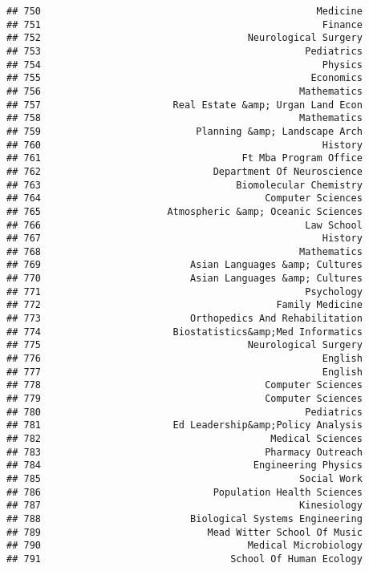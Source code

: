 \documentclass[
]{article}
\begin{document}
\begin{verbatim}
## 750                                                Medicine
## 751                                                 Finance
## 752                                    Neurological Surgery
## 753                                              Pediatrics
## 754                                                 Physics
## 755                                               Economics
## 756                                             Mathematics
## 757                       Real Estate &amp; Urgan Land Econ
## 758                                             Mathematics
## 759                           Planning &amp; Landscape Arch
## 760                                                 History
## 761                                   Ft Mba Program Office
## 762                              Department Of Neuroscience
## 763                                  Biomolecular Chemistry
## 764                                       Computer Sciences
## 765                      Atmospheric &amp; Oceanic Sciences
## 766                                              Law School
## 767                                                 History
## 768                                             Mathematics
## 769                          Asian Languages &amp; Cultures
## 770                          Asian Languages &amp; Cultures
## 771                                              Psychology
## 772                                         Family Medicine
## 773                          Orthopedics And Rehabilitation
## 774                       Biostatistics&amp;Med Informatics
## 775                                    Neurological Surgery
## 776                                                 English
## 777                                                 English
## 778                                       Computer Sciences
## 779                                       Computer Sciences
## 780                                              Pediatrics
## 781                       Ed Leadership&amp;Policy Analysis
## 782                                        Medical Sciences
## 783                                       Pharmacy Outreach
## 784                                     Engineering Physics
## 785                                             Social Work
## 786                              Population Health Sciences
## 787                                             Kinesiology
## 788                          Biological Systems Engineering
## 789                             Mead Witter School Of Music
## 790                                    Medical Microbiology
## 791                                 School Of Human Ecology

\end{verbatim}
\end{document}
